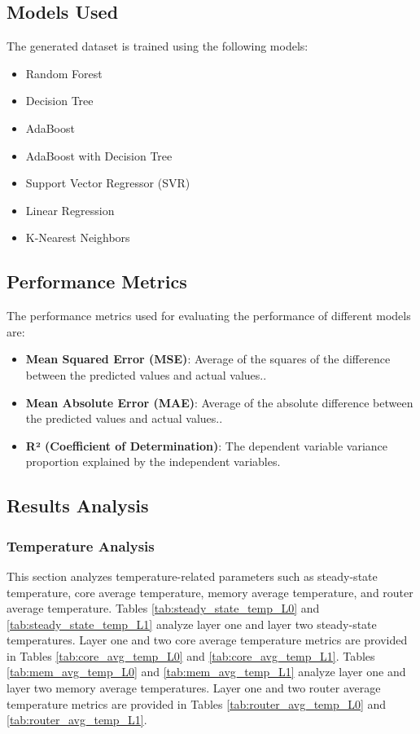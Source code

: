 \documentclass[conference]{IEEEtran}
\begin{document}
	\subsection{Models Used}
	The generated dataset is trained using the following models:
	\begin{itemize}
		\item Random Forest
		\item Decision Tree
		\item AdaBoost
		\item AdaBoost with Decision Tree
		\item Support Vector Regressor (SVR)
		\item Linear Regression
		\item K-Nearest Neighbors
	\end{itemize}
	

	\subsection{Performance Metrics}
	The performance metrics used for evaluating the performance of different models are:
	
	\begin{itemize}
		\item \textbf{Mean Squared Error (MSE)}: Average of the squares of the difference between the predicted values and actual values..
		\item \textbf{Mean Absolute Error (MAE)}: Average of the absolute difference between the predicted values and actual values..
		\item \textbf{R² (Coefficient of Determination)}: The dependent variable variance proportion explained by the independent variables.
	\end{itemize}
\subsection{Results Analysis}

	\subsubsection{Temperature Analysis}
	This section analyzes temperature-related parameters such as steady-state temperature, core average temperature, memory average temperature, and router average temperature. Tables \ref{tab:steady_state_temp_L0} and \ref{tab:steady_state_temp_L1} analyze layer one and layer two steady-state temperatures. Layer one and two core average temperature metrics are provided in Tables \ref{tab:core_avg_temp_L0} and \ref{tab:core_avg_temp_L1}. Tables \ref{tab:mem_avg_temp_L0} and \ref{tab:mem_avg_temp_L1} analyze layer one and layer two memory average temperatures. Layer one and two router average temperature metrics are provided in Tables \ref{tab:router_avg_temp_L0} and \ref{tab:router_avg_temp_L1}.
\end{document}
